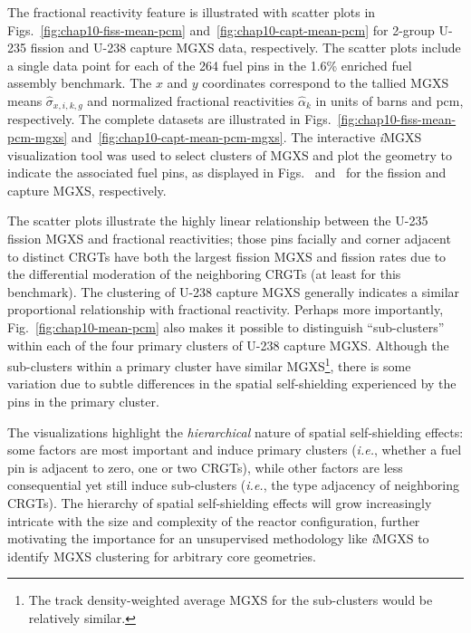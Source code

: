The fractional reactivity feature is illustrated with scatter plots in Figs.~\ref{fig:chap10-fiss-mean-pcm} and~\ref{fig:chap10-capt-mean-pcm} for 2-group U-235 fission and U-238 capture \ac{MGXS} data, respectively. The scatter plots include a single data point for each of the 264 fuel pins in the 1.6\% enriched fuel assembly benchmark. The $x$ and $y$ coordinates correspond to the tallied \ac{MGXS} means $\hat{\sigma}_{x,i,k,g}$ and normalized fractional reactivities $\hat{\alpha}_{k}$ in units of barns and \ac{pcm}, respectively. The complete datasets are illustrated in Figs.~\ref{fig:chap10-fiss-mean-pcm-mgxs} and~\ref{fig:chap10-capt-mean-pcm-mgxs}. The interactive \textit{i}\ac{MGXS} visualization tool was used to select clusters of \ac{MGXS} and plot the geometry to indicate the associated fuel pins, as displayed in Figs.~ and~ for the fission and capture \ac{MGXS}, respectively. 

The scatter plots illustrate the highly linear relationship between the U-235 fission \ac{MGXS} and fractional reactivities; those pins facially and corner adjacent to distinct \acp{CRGT} have both the largest fission \ac{MGXS} and fission rates due to the differential moderation of the neighboring \acp{CRGT} (at least for this benchmark). The clustering of U-238 capture \ac{MGXS} generally indicates a similar proportional relationship with fractional reactivity. Perhaps more importantly, Fig.~\ref{fig:chap10-mean-pcm} also makes it possible to distinguish ``sub-clusters'' within each of the four primary clusters of U-238 capture \ac{MGXS}. Although the sub-clusters within a primary cluster have similar \ac{MGXS}\footnote{The track density-weighted average \ac{MGXS} for the sub-clusters would be relatively similar.}, there is some variation due to subtle differences in the spatial self-shielding experienced by the pins in the primary cluster.

The visualizations highlight the \textit{hierarchical} nature of spatial self-shielding effects: some factors are most important and induce primary clusters (\textit{i.e.}, whether a fuel pin is adjacent to zero, one or two \acp{CRGT}), while other factors are less consequential yet still induce sub-clusters (\textit{i.e.}, the type adjacency of neighboring \acp{CRGT}). The hierarchy of spatial self-shielding effects will grow increasingly intricate with the size and complexity of the reactor configuration, further motivating the importance for an unsupervised methodology like \textit{i}\ac{MGXS} to identify \ac{MGXS} clustering for arbitrary core geometries.

